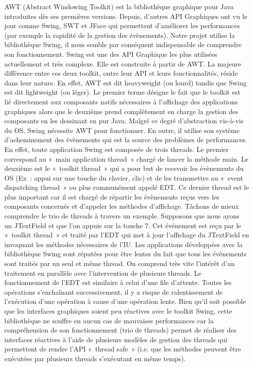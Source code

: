 AWT (Abstract Windowing Toolkit) est la bibliothèque graphique pour Java introduites dès ses premières versions. Depuis, d’autres API Graphiques ont vu le jour comme Swing, SWT et JFace qui permettent d’améliorer les performances (par exemple la rapidité de la gestion des évènements). Notre projet utilise la bibliothèque Swing, il nous semble par conséquent indispensable de comprendre son fonctionnement.
Swing est une des API Graphique les plus utilisées actuellement et très complexe. Elle est construite à partir de AWT. La majeure différence entre ces deux toolkit, outre leur API et leurs fonctionnalités, réside dans leur nature. En effet, AWT est dit heavyweight (ou lourd) tandis que Swing est dit lightweight (ou léger). Le premier terme désigne le fait que le toolkit est lié directement aux composants natifs nécessaires à l’affichage des applications graphiques alors que le deuxième prend complètement en charge la gestion des composants en les dessinant en pur Java.
Malgré ce degré d’abstraction vis-à-vis du OS, Swing nécessite AWT pour fonctionner. En outre, il utilise son système d’acheminement des évènements qui est la source des problèmes de performances. En effet, toute application Swing est composée de trois threads.
Le premier correspond au « main application thread » chargé de lancer la méthode main. Le deuxième est le « toolkit thread » qui a pour but de recevoir les évènements du OS (Ex : appui sur une touche du clavier, clic) et de les transmettre au « event dispatching thread » ou plus communément appelé EDT. Ce dernier thread est le plus important car il est chargé de répartir les évènements reçus vers les composants concernés et d’appeler les méthodes d’affichage.
Tâchons de mieux comprendre le trio de threads à travers un exemple. Supposons que nous ayons un JTextField et que l’on appuie sur la touche 7. Cet événement est reçu par le « toolkit thread » et traité par l’EDT qui met à jour l’affichage du JTextField en invoquant les méthodes nécessaires de l’IU.
Les applications développées avec la bibliothèque Swing sont réputées pour être lentes du fait que tous les évènements sont traités par un seul et même thread. On comprend très vite l’intérêt d’un traitement en parallèle avec l’intervention de plusieurs threads. Le fonctionnement de l’EDT est similaire à celui d’une file d’attente. Toutes les opérations s’enchaînant successivement, il y a risque de ralentissement de l’exécution d’une opération à cause d’une opération lente. Bien qu’il soit possible que les interfaces graphiques soient peu réactives avec le toolkit Swing, cette bibliothèque ne souffre en aucun cas de mauvaises performances car la compréhension de son fonctionnement (trio de threads) permet de réaliser des interfaces réactives à l’aide de plusieurs modèles de gestion des threads qui permettent de rendre l’API « thread safe » (i.e. que les méthodes peuvent être exécutées par plusieurs threads s’exécutant en même temps).

